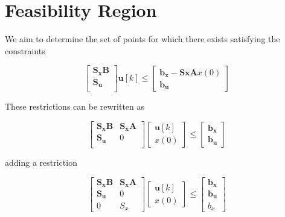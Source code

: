 \section{Feasibility Region}
\label{section_reasibility_region}

We aim to determine the set  of points  for 
which there exists  satisfying the constraints

\noindent
\begin{equation}
    \left[
    \begin{matrix}
        \mathbf{S_x} \mathbf{B} \\
        \mathbf{S_u} \\
    \end{matrix}
    \right] \mathbf{u}[k] \le
    \left[
    \begin{matrix}
        \mathbf{b_x} - \mathbf{Sx} \mathbf{A} x(0) \\
        \mathbf{b_u}
    \end{matrix}
    \right]
\end{equation}

These restrictions can be rewritten as

\noindent
\begin{equation}
    \left[
    \begin{matrix}
        \mathbf{S_x} \mathbf{B} & \mathbf{S_x} \mathbf{A} \\
        \mathbf{S_u} & 0 \\
    \end{matrix}
    \right] 
    \left[
        \begin{matrix}
            \mathbf{u}[k] \\
            x(0)
        \end{matrix}
    \right]
    \le
    \left[
    \begin{matrix}
        \mathbf{b_x} \\
        \mathbf{b_u}
    \end{matrix}
    \right]
\end{equation}

\noindent
adding a restriction 

\noindent
\begin{equation}
    \left[
    \begin{matrix}
        \mathbf{S_x} \mathbf{B} & \mathbf{S_x} \mathbf{A} \\
        \mathbf{S_u} & 0 \\
        0 & S_x
    \end{matrix}
    \right] 
    \left[
        \begin{matrix}
            \mathbf{u}[k] \\
            x(0)
        \end{matrix}
    \right]
    \le
    \left[
    \begin{matrix}
        \mathbf{b_x} \\
        \mathbf{b_u} \\
        b_x
    \end{matrix}
    \right]
\end{equation}

